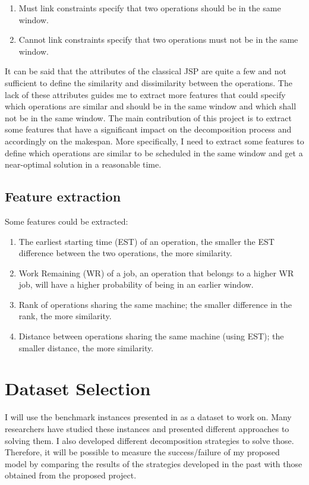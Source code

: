 \documentclass{article}
\begin{document}
\begin{enumerate}
    \item Must link constraints specify that two operations should be in the same window.
    \item Cannot link constraints specify that two operations must not be in the same window.
\end{enumerate}

It can be said that the attributes of the classical JSP are quite a few and not sufficient to define the similarity and dissimilarity between the operations. The lack of these attributes guides me to extract more features that could specify which operations are similar and should be in the same window and which shall not be in the same window. The main contribution of this project is to extract some features that have a significant impact on the decomposition process and accordingly on the makespan. More specifically, I need to extract some features to define which operations are similar to be scheduled in the same window and get a near-optimal solution in a reasonable time. 

\subsection{Feature extraction}
Some features could be extracted:
\begin{enumerate}
    \item The earliest starting time (EST) of an operation, the smaller the EST difference between the two operations, the more similarity.
    \item Work Remaining (WR) of a job, an operation that belongs to a higher WR job, will have a higher probability of being in an earlier window.
    \item Rank of operations sharing the same machine; the smaller difference in the rank, the more similarity.
    \item Distance between operations sharing the same machine (using EST); the smaller distance, the more similarity.
\end{enumerate}

\section{Dataset Selection}
I will use the benchmark instances presented in \cite{taillard1993benchmarks} as a dataset to work on. Many researchers have studied these instances and presented different approaches to solving them. I also developed different decomposition strategies to solve those. Therefore, it will be possible to measure the success/failure of my proposed model by comparing the results of the strategies developed in the past with those obtained from the proposed project. 

\newpage


\end{document}
